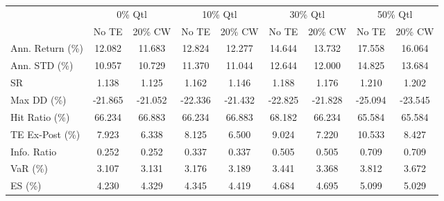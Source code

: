\begin{tabular}{lcccccccc}
\toprule
{} & \multicolumn{2}{c}{0\% Qtl} & \multicolumn{2}{c}{10\% Qtl} & \multicolumn{2}{c}{30\% Qtl} & \multicolumn{2}{c}{50\% Qtl} \\
{} &   No TE &  20\% CW &   No TE &  20\% CW &   No TE &  20\% CW &   No TE &  20\% CW \\
\midrule
Ann. Return (\%) &  12.082 &  11.683 &  12.824 &  12.277 &  14.644 &  13.732 &  17.558 &  16.064 \\
Ann. STD (\%)    &  10.957 &  10.729 &  11.370 &  11.044 &  12.644 &  12.000 &  14.825 &  13.684 \\
SR              &   1.138 &   1.125 &   1.162 &   1.146 &   1.188 &   1.176 &   1.210 &   1.202 \\
Max DD (\%)      & -21.865 & -21.052 & -22.336 & -21.432 & -22.825 & -21.828 & -25.094 & -23.545 \\
Hit Ratio (\%)   &  66.234 &  66.883 &  66.234 &  66.883 &  68.182 &  66.234 &  65.584 &  65.584 \\
TE Ex-Post (\%)  &   7.923 &   6.338 &   8.125 &   6.500 &   9.024 &   7.220 &  10.533 &   8.427 \\
Info. Ratio     &   0.252 &   0.252 &   0.337 &   0.337 &   0.505 &   0.505 &   0.709 &   0.709 \\
VaR (\%)         &   3.107 &   3.131 &   3.176 &   3.189 &   3.441 &   3.368 &   3.812 &   3.672 \\
ES (\%)          &   4.230 &   4.329 &   4.345 &   4.419 &   4.684 &   4.695 &   5.099 &   5.029 \\
\bottomrule
\end{tabular}
